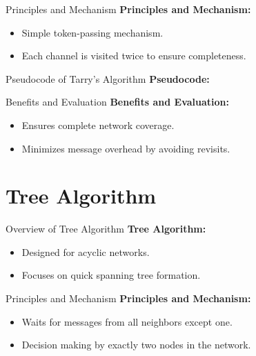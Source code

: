 \documentclass[11pt]{beamer}
\begin{document}
\begin{frame}{Principles and Mechanism}
    \textbf{Principles and Mechanism:}
    \begin{itemize}
        \item Simple token-passing mechanism.
        \item Each channel is visited twice to ensure completeness.
    \end{itemize}
\end{frame}

\begin{frame}{Pseudocode of Tarry's Algorithm}
    \textbf{Pseudocode:}
    \begin{algorithm}[H]
    \SetAlgoLined
    \caption{Tarry's Algorithm}
    \end{algorithm}
\end{frame}

\begin{frame}{Benefits and Evaluation}
    \textbf{Benefits and Evaluation:}
    \begin{itemize}
        \item Ensures complete network coverage.
        \item Minimizes message overhead by avoiding revisits.
    \end{itemize}
\end{frame}

\section{Tree Algorithm}
\begin{frame}{Overview of Tree Algorithm}
    \textbf{Tree Algorithm:}
    \begin{itemize}
        \item Designed for acyclic networks.
        \item Focuses on quick spanning tree formation.
    \end{itemize}
\end{frame}

\begin{frame}{Principles and Mechanism}
    \textbf{Principles and Mechanism:}
    \begin{itemize}
        \item Waits for messages from all neighbors except one.
        \item Decision making by exactly two nodes in the network.
    \end{itemize}
\end{frame}
\end{document}
